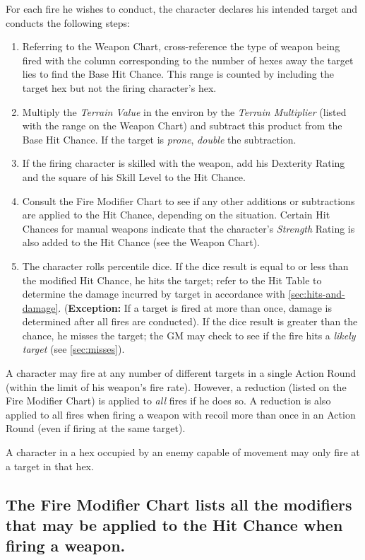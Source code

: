 For each fire he wishes to conduct, the character declares his
intended target and conducts the following steps:

\begin{enumerate}
\item Referring to the Weapon Chart, cross-reference the type of
  weapon being fired with the column corresponding to the number of
  hexes away the target lies to find the Base Hit Chance. This range
  is counted by including the target hex but not the firing
  character's hex.
\item Multiply the \emph{Terrain Value} in the environ by the
  \emph{Terrain Multiplier} (listed with the range on the Weapon
  Chart) and subtract this product from the Base Hit Chance. If the
  target is \emph{prone}, \emph{double} the subtraction.
\item If the firing character is skilled with the weapon, add his
  Dexterity Rating and the square of his Skill Level to the Hit
  Chance.
\item Consult the Fire Modifier Chart to see if any other additions or
  subtractions are applied to the Hit Chance, depending on the
  situation. Certain Hit Chances for manual weapons indicate that the
  character's \emph{Strength} Rating is also added to the Hit Chance
  (see the Weapon Chart).
\item The character rolls percentile dice. If the dice result is equal
  to or less than the modified Hit Chance, he hits the target; refer
  to the Hit Table to determine the damage incurred by target in
  accordance with \ref{sec:hits-and-damage}. (\textbf{Exception:} If a
  target is fired at more than once, damage is determined after all
  fires are conducted). If the dice result is greater than the chance,
  he misses the target; the GM may check to see if the fire hits a
  \emph{likely target} (see \ref{sec:misses}).
\end{enumerate}

A character may fire at any number of different targets in a single
Action Round (within the limit of his weapon's fire rate). However, a
reduction (listed on the Fire Modifier Chart) is applied to \emph{all}
fires if he does so. A reduction is also applied to all fires when
firing a weapon with recoil more than once in an Action Round (even if
firing at the same target).

A character in a hex occupied by an enemy capable of movement may only
fire at a target in that hex.

\subsection[Fire Modifier Chart]{The Fire Modifier Chart lists all the
  modifiers that may 
  be applied to the Hit Chance when firing a weapon.}
\label{sec:fire-modifier-chart}

